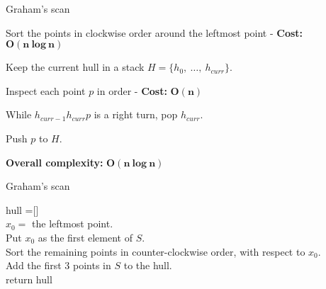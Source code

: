 \documentclass[14pt, handout]{beamer}
\begin{document}
\begin{frame}{Graham's scan}
	\begin{center}
		\vspace{-5mm}
		\begin{fullpageitemize}
			\item<1->[\rtarrow] Sort the points in clockwise order around the leftmost point - \textbf{Cost:}  \textcolor{colorgreen}{$\bm{O(n\ log\ n)}$}
			\vspace{5mm}
			\item<2->[\rtarrow] Keep the current hull in a stack $H = \{h_0,\ \ldots,\ h_{curr}\}$.
			\vspace{5mm}
			
			\item<3->[\rtarrow] Inspect each point $p$ in order - \textbf{Cost:}  \textcolor{colorgreen}{$\bm{O(n)}$}
			
			\vspace{2mm}
			\fontsize{12}{14}\notosansfont
			\begin{sublist}
				\item<4->While $h_{curr-1}h_{curr}p$ is a right turn, pop $h_{curr}$.
				\item<5->Push $p$ to $H$.
			\end{sublist}
		
			\vspace{5mm}
			\item<6->[\rtarrow] \textbf{Overall complexity:} \textcolor{colorgreen}{$\bm{O(n\ log\ n)}$}
		\end{fullpageitemize}	
	\end{center}
\end{frame}

\begin{frame}{Graham's scan}
	\fontsize{10}{12}\notosansfont
	\begin{algorithm}[H]
		\DontPrintSemicolon
		\SetAlgoVlined
		hull =[]\\
		$x_0 =$ the leftmost point.\\
		Put $x_0$ as the first element of $S$.\\
		Sort the remaining points in counter-clockwise order, with respect to $x_0$.\\
		Add the first 3 points in $S$ to the hull. \\
		
		
		return hull
		\caption{Graham Scan}
	\end{algorithm}	
\end{frame}
\end{document}
